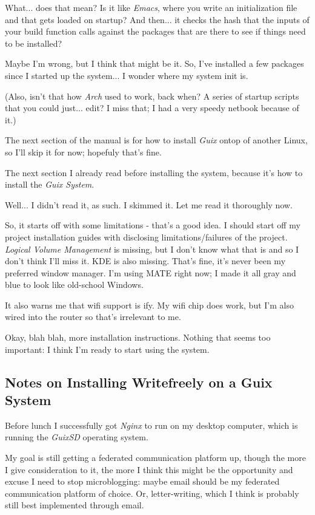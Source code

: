 \documentclass[11pt]{article}
\begin{document}
What... does that mean? Is it like \emph{Emacs}, where you write an
initialization file and that gets loaded on startup? And then... it
checks the hash that the inputs of your build function calls against
the packages that are there to see if things need to be installed?

Maybe I'm wrong, but I think that might be it. So, I've installed a
few packages since I started up the system... I wonder where my system
init is.

(Also, isn't that how \emph{Arch} used to work, back when? A series of
startup scripts that you could just... edit? I miss that; I had a very
speedy netbook because of it.)

The next section of the manual is for how to install \emph{Guix} ontop of
another Linux, so I'll skip it for now; hopefuly that's fine.

The next section I already read before installing the system, because
it's how to install the \emph{Guix System}.

Well... I didn't read it, as such. I skimmed it. Let me read it
thoroughly now.

So, it starts off with some limitations - that's a good idea. I should
start off my project installation guides with disclosing
limitations/failures of the project. \emph{Logical Volume Management} is
missing, but I don't know what that is and so I don't think I'll miss
it. KDE is also missing. That's fine, it's never been my preferred
window manager. I'm using MATE right now; I made it all gray and blue
to look like old-school Windows.

It also warns me that wifi support is ify. My wifi chip does work, but
I'm also wired into the router so that's irrelevant to me.

Okay, blah blah, more installation instructions. Nothing that seems
too important: I think I'm ready to start using the system.
\subsection*{Notes on Installing Writefreely on a Guix System}
\label{sec:orgaedb079}
Before lunch I successfully got \emph{Nginx} to run on my desktop computer,
which is running the \emph{GuixSD} operating system.

My goal is still getting a federated communication platform up, though
the more I give consideration to it, the more I think this might be
the opportunity and excuse I need to stop microblogging: maybe email
should be my federated communication platform of choice. Or,
letter-writing, which I think is probably still best implemented
through email.
\end{document}
